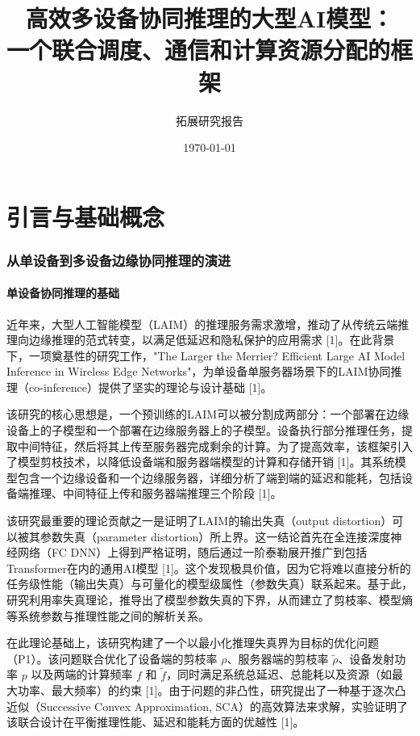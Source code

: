 \documentclass[11pt, a4paper]{article}
\title{\bfseries 高效多设备协同推理的大型AI模型：\\一个联合调度、通信和计算资源分配的框架}
\author{拓展研究报告}
\date{\today}
\begin{document}
\maketitle
\thispagestyle{empty}
\newpage

\tableofcontents
\thispagestyle{empty}
\newpage

\setcounter{page}{1}

\part{引言与基础概念}

\section{从单设备到多设备边缘协同推理的演进}

\subsection{单设备协同推理的基础}

近年来，大型人工智能模型（LAIM）的推理服务需求激增，推动了从传统云端推理向边缘推理的范式转变，以满足低延迟和隐私保护的应用需求 [1]。在此背景下，一项奠基性的研究工作，"The Larger the Merrier? Efficient Large AI Model Inference in Wireless Edge Networks"，为单设备单服务器场景下的LAIM协同推理（co-inference）提供了坚实的理论与设计基础 [1]。

该研究的核心思想是，一个预训练的LAIM可以被分割成两部分：一个部署在边缘设备上的子模型和一个部署在边缘服务器上的子模型。设备执行部分推理任务，提取中间特征，然后将其上传至服务器完成剩余的计算。为了提高效率，该框架引入了模型剪枝技术，以降低设备端和服务器端模型的计算和存储开销 [1]。其系统模型包含一个边缘设备和一个边缘服务器，详细分析了端到端的延迟和能耗，包括设备端推理、中间特征上传和服务器端推理三个阶段 [1]。

该研究最重要的理论贡献之一是证明了LAIM的输出失真（output distortion）可以被其参数失真（parameter distortion）所上界。这一结论首先在全连接深度神经网络（FC DNN）上得到严格证明，随后通过一阶泰勒展开推广到包括Transformer在内的通用AI模型 [1]。这个发现极具价值，因为它将难以直接分析的任务级性能（输出失真）与可量化的模型级属性（参数失真）联系起来。基于此，研究利用率失真理论，推导出了模型参数失真的下界，从而建立了剪枝率、模型熵等系统参数与推理性能之间的解析关系。

在此理论基础上，该研究构建了一个以最小化推理失真界为目标的优化问题（P1）。该问题联合优化了设备端的剪枝率 $\rho$、服务器端的剪枝率 $\tilde{\rho}$、设备发射功率 $p$ 以及两端的计算频率 $f$ 和 $\tilde{f}$，同时满足系统总延迟、总能耗以及资源（如最大功率、最大频率）的约束 [1]。由于问题的非凸性，研究提出了一种基于逐次凸近似（Successive Convex Approximation, SCA）的高效算法来求解，实验证明了该联合设计在平衡推理性能、延迟和能耗方面的优越性 [1]。
\end{document}

